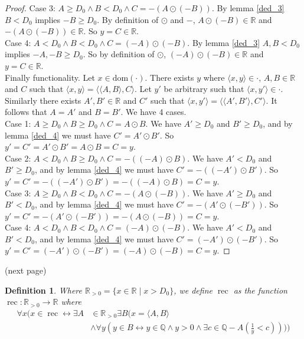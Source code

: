 \documentclass{report}
\newtheorem{definition}[theo]{Definition}
\begin{document}
\begin{proof}
\indent Case 3: $A\geq D_0\land B<D_0\land C=-(A\odot(-B))$. By lemma \ref{ded_3} $B<D_0$ implies $-B\geq D_0$. By definition of $\odot$ and $-$, $A\odot(-B)\in\mathbb R$ and 
$-(A\odot(-B))\in\mathbb R$. So $y=C\in\mathbb R$.\\
\indent Case 4: $A<D_0\land B<D_0\land C=(-A)\odot(-B)$. By lemma \ref{ded_3} $A,B<D_0$ implies $-A,-B\geq D_0$. So by definition of $\odot$, $(-A)\odot(-B)\in\mathbb R$ and $y=C\in\mathbb R$.\\
\indent Finally functionality. Let $x\in\text{dom}(\cdot)$. There exists $y$ where $\langle x,y\rangle\in\cdot$, $A,B\in\mathbb R$ and $C$ such that 
$\langle x,y\rangle=\langle\langle A,B\rangle,C\rangle$. Let $y'$ be arbitrary such that $\langle x,y'\rangle\in\cdot$. Similarly there exists $A',B'\in\mathbb R$ and $C'$ such that 
$\langle x,y'\rangle=\langle\langle A',B'\rangle,C'\rangle$. It follows that $A=A'$ and $B=B'$. We have 4 cases.\\
\indent Case 1: $A\geq D_0\land B\geq D_0\land C=A\odot B$. We have $A'\geq D_0$ and $B'\geq D_0$, and by lemma \ref{ded_4} we must have $C'=A'\odot B'$. So $y'=C'=A'\odot B'=A\odot B=C=y$.\\
\indent Case 2: $A<D_0\land B\geq D_0\land C=-((-A)\odot B)$. We have $A'< D_0$ and $B'\geq D_0$, and by lemma \ref{ded_4} we must have $C'=-((-A')\odot B')$. 
So $y'=C'=-((-A')\odot B')=-((-A)\odot B)=C=y$.\\
\indent Case 3: $A\geq D_0\land B<D_0\land C=-(A\odot(-B))$. We have $A'\geq D_0$ and $B'<D_0$, and by lemma \ref{ded_4} we must have $C'=-(A'\odot(-B'))$. 
So $y'=C'=-(A'\odot(-B'))=-(A\odot(-B))=C=y$.\\
\indent Case 4: $A<D_0\land B<D_0\land C=(-A)\odot(-B)$. We have $A'<D_0$ and $B'<D_0$, and by lemma \ref{ded_4} we must have $C'=(-A')\odot(-B')$. So $y'=C'=(-A')\odot(-B')=(-A)\odot(-B)=C=y$.
\end{proof}
\noindent(next page)\newpage
\begin{definition}
Where $\mathbb R_{>0}=\{x\in\mathbb R\mid x>D_0\}$,
we define $\operatorname{rec}$ as the function $\operatorname{rec}:\mathbb R_{>0}\to\mathbb R$ where
\begin{align*}
\forall x(x\in\operatorname{rec}\leftrightarrow\exists A&\in\mathbb R_{>0}\exists B(x=\langle A,B\rangle\\
&\land\forall y(y\in B\leftrightarrow y\in\mathbb Q\land y>0\land\exists c\in\mathbb Q-A\left(\frac{1}{y}<c\right))))
\end{align*}
\end{definition}
\end{document}
